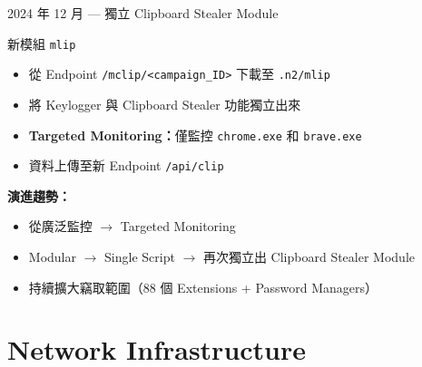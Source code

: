 \documentclass{beamer}
\begin{document}
\begin{frame}{2024 年 12 月 — 獨立 Clipboard Stealer Module}
  \begin{block}{新模組 \texttt{mlip}}
    \begin{itemize}
      \item 從 Endpoint \texttt{/mclip/<campaign\_ID>} 下載至 \texttt{.n2/mlip}
      \item 將 Keylogger 與 Clipboard Stealer 功能獨立出來
      \item \textbf{Targeted Monitoring：}僅監控 \texttt{chrome.exe} 和 \texttt{brave.exe}
      \item 資料上傳至新 Endpoint \texttt{/api/clip}
    \end{itemize}
  \end{block}

  \vspace{0.3cm}
  \textbf{演進趨勢：}
  \begin{itemize}
    \item 從廣泛監控 $\rightarrow$ Targeted Monitoring
    \item Modular $\rightarrow$ Single Script $\rightarrow$ 再次獨立出 Clipboard Stealer Module
    \item 持續擴大竊取範圍（88 個 Extensions + Password Managers）
  \end{itemize}
\end{frame}

\section{Network Infrastructure}
\end{document}
